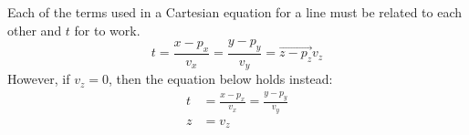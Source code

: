 Each of the terms used in a Cartesian equation for a line must be related to each other and $t$ for  to work.
\begin{equation}\label{eq:Parametric_Cartesian_Line}
  t = \frac{x-p_{x}}{v_{x}} = \frac{y-p_{y}}{v_{y}} = \vec{z-p_{z}}{v_{z}}
\end{equation}
However, if $v_{z} = 0$, then the equation below holds instead:
\begin{equation*}
  \begin{aligned}
    t &= \frac{x-p_{x}}{v_{x}} = \frac{y-p_{y}}{v_{y}} \\
    z &= v_{z} \\
\end{aligned}
\end{equation*}


